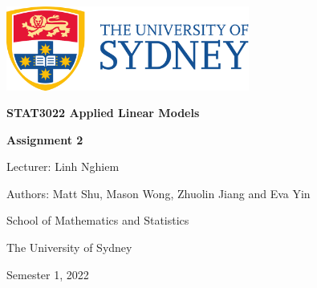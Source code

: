 \includegraphics[width=8cm]{./UsydLogo}

\vspace{1cm}


\horline

\vspace{0.3cm}

{\centering\bfseries \Large \textsc{STAT3022} Applied Linear Models

}

\vspace{0.2cm}

\horline

\vspace{6cm}

{\large \centering \bfseries Assignment 2

}

{\centering

\vspace{1cm}

Lecturer: Linh Nghiem

Authors: Matt Shu, Mason Wong, Zhuolin Jiang and Eva Yin

\vspace{1cm}

School of Mathematics and Statistics

The University of Sydney

\vfill

Semester 1, 2022\newpage

}
